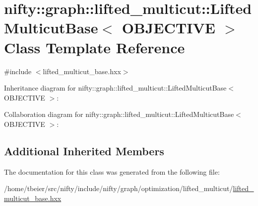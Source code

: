 \hypertarget{classnifty_1_1graph_1_1lifted__multicut_1_1LiftedMulticutBase}{}\section{nifty\+:\+:graph\+:\+:lifted\+\_\+multicut\+:\+:Lifted\+Multicut\+Base$<$ O\+B\+J\+E\+C\+T\+I\+V\+E $>$ Class Template Reference}
\label{classnifty_1_1graph_1_1lifted__multicut_1_1LiftedMulticutBase}


{\ttfamily \#include $<$lifted\+\_\+multicut\+\_\+base.\+hxx$>$}



Inheritance diagram for nifty\+:\+:graph\+:\+:lifted\+\_\+multicut\+:\+:Lifted\+Multicut\+Base$<$ O\+B\+J\+E\+C\+T\+I\+V\+E $>$\+:


Collaboration diagram for nifty\+:\+:graph\+:\+:lifted\+\_\+multicut\+:\+:Lifted\+Multicut\+Base$<$ O\+B\+J\+E\+C\+T\+I\+V\+E $>$\+:
\subsection*{Additional Inherited Members}


The documentation for this class was generated from the following file\+:\begin{DoxyCompactItemize}
\item 
/home/tbeier/src/nifty/include/nifty/graph/optimization/lifted\+\_\+multicut/\hyperlink{lifted__multicut__base_8hxx}{lifted\+\_\+multicut\+\_\+base.\+hxx}\end{DoxyCompactItemize}
